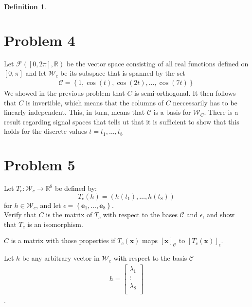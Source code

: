 \documentclass[paper=a4, fontsize=11pt]{scrartcl} %
\numberwithin{equation}{section} %
\numberwithin{figure}{section} %
\numberwithin{table}{section} %
\theoremstyle{definition}
\newtheorem*{definition}{Definition}
\begin{document}
\begin{definition}
\section*{Problem 4}
Let $\mathcal{F}([0, 2\pi], \mathbb{R})$ be the vector space consisting of all real functions defined on $\left[ 0, \pi \right]$ and let
$\mathcal{W}_c$ be its subspace that is spanned by the set
\begin{align*}
  \mathcal{C} = \left\{ 1, \cos(t), \cos(2t), \dots, \cos(7t) \right\}
\end{align*}
We showed in the previous problem that $C$ is semi-orthogonal. It then follows that $C$ is invertible, which means that the columns of $C$ neccessarily
has to be linearly independent. This, in turn, means that $\mathcal{C}$ is a basis for $\mathcal{W}_C$.
There is a result regarding signal spaces that tells ut that it is sufficient to show that this holds for the discrete values
$t = t_1, \dots, t_8$

\section*{Problem 5}
Let $T_c : \mathcal{W}_c \rightarrow \mathbb{R}^8$ be defined by:
$$ T_c\left( h \right) = \left( h(t_1),\dots,h(t_8) \right) $$
for $h \in \mathcal{W}_c$, and let $\epsilon = \left\{ \mathbf{e}_1, \dots, \mathbf{e}_8 \right\}$. \\

Verify that $C$ is the matrix of $T_c$ with respect to the bases $\mathcal{C}$ and $\epsilon$, and show that $T_c$ is an isomorphism. 

$C$ is a matrix with those properties if $T_c(\mathbf{x})$ maps $\left[\mathbf{x}\right]_\mathcal{C}$ to $\left[ T_c(\mathbf{x}) \right]_\epsilon$.

Let $h$ be any arbitrary vector in $\mathcal{W}_c$ with respect to the basis $\mathcal{C}$
\begin{align*}
  h = \begin{bmatrix}
    \lambda_1 \\
	\vdots \\
	\lambda_8\\
  \end{bmatrix}
\end{align*}.


\end{definition}
\end{document}
